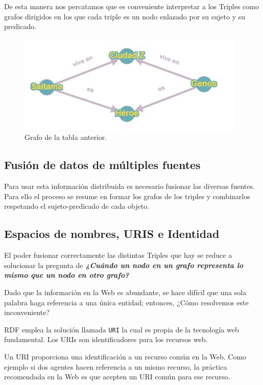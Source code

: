 \documentclass[conference]{IEEEtran}
\begin{document}
De esta manera nos percatamos que es conveniente interpretar a los Triples como grafos dirigidos en los que cada triple es un nodo enlazado por su sujeto y su predicado.

\begin{figure}[H]
\centering
\includegraphics[scale=0.7]{img/G - 01.JPG} 
\caption{Grafo de la tabla anterior.}
\end{figure}



\subsection{Fusión de datos de múltiples fuentes}

Para usar esta información distribuida es necesario fusionar las diversas fuentes.
Para ello el proceso se resume en formar los grafos de los triples y combinarlos respetando el sujeto-predicado de cada objeto.

\subsection{Espacios de nombres, URIS e Identidad}

El poder fusionar correctamente las distintas Triples que hay se reduce a solucionar la pregunta de \textbf{\textit{¿Cuándo un nodo en un grafo representa lo mismo que un nodo en otro grafo?}}

Dado que la información en la Web es abundante, se hace difícil que una sola palabra haga referencia a una única entidad; entonces, ¿Cómo resolvemos este inconveniente?

RDF emplea la solución llamada \texttt{URI} la cual es propia de la tecnología web fundamental.
Los URIs son identificadores para los recursos web.

Un URI proporciona una identificación a un recurso común en la Web. Como ejemplo si dos agentes hacen referencia a un mismo recurso, la práctica recomendada en la Web es que acepten un URI común para ese recurso.
\end{document}

